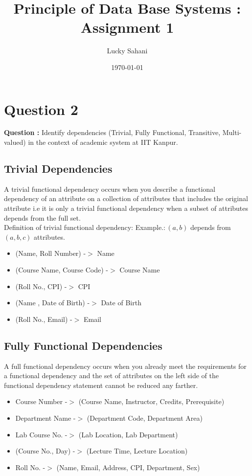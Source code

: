 \documentclass[a4paper]{article}
\title{Principle of Data Base Systems : Assignment 1}
\date{\today}
\author{Lucky Sahani}
\begin{document}
\maketitle

\section{Question 2}
\label{sec:q1}
{\bf Question :} Identify dependencies (Trivial, Fully Functional, Transitive, Multi-valued) in the context of  academic system at IIT Kanpur. 
\subsection{Trivial Dependencies}
A trivial functional dependency occurs when you describe a functional dependency of an attribute on a collection of attributes that includes the original attribute i.e it is only a trivial functional dependency when a subset of attributes depends from the full set. \\Definition of trivial functional dependency: Example.$: (a,b)$ depends from $(a,b,c)$ attributes.
\begin{itemize}
\item (Name, Roll Number) -$>$ Name
\item (Course Name, Course Code) -$>$ Course Name
\item (Roll No., CPI) -$>$ CPI
\item (Name , Date of Birth) -$>$ Date of Birth
\item (Roll No., Email) -$>$ Email
\end{itemize}

\subsection{Fully Functional Dependencies}
A full functional dependency occurs when you already meet the requirements for a functional dependency and the set of attributes on the left side of the functional dependency statement cannot be reduced any farther.
\begin{itemize}
\item Course Number -$>$ (Course Name, Instructor, Credits, Prerequisite)
\item Department Name -$>$ (Department Code, Department Area)
\item Lab Course No. -$>$ (Lab Location, Lab Department)
\item (Course No., Day) -$>$ (Lecture Time, Lecture Location)
\item Roll No. -$>$ (Name, Email, Address, CPI, Department, Sex)
\end{itemize}
\end{document}
